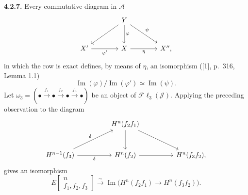 \medskip\noindent\textbf{4.2.7.}
Every commutative diagram in $\mathcal A$
\[
\begin{tikzcd}[column sep=4em,row sep=2.7em]
&Y\arrow[dl]\arrow[d,"\varphi"]\arrow[dr,"\psi"]&\\
X'\arrow[r,"\varphi'"']&X\arrow[r,"\eta"']&X'',
\end{tikzcd}
\]
in which the row is exact defines, by means of $\eta$, an isomorphism
([1], p.~316, Lemma 1.1)
\[
\operatorname{Im}(\varphi)\big/\operatorname{Im}(\varphi')
\simeq\operatorname{Im}(\psi).
\]
Let
$\omega_3=(\mathord\bullet\xrightarrow{f_1}\mathord\bullet
\xrightarrow{f_2}\mathord\bullet\xrightarrow{f_3}\mathord\bullet)$
be an object of $\mathcal{F}\ell_3(\mathcal J)$. Applying the preceding
observation to the diagram
\[
\begin{tikzcd}[column sep=4.6em,row sep=2.8em]
&H^n(f_2f_1)\arrow[d]\arrow[dr]&\\
H^{n-1}(f_3)\arrow[ur,"\delta"]\arrow[r,"\delta"']&
H^n(f_2)\arrow[r]&H^n(f_3f_2),
\end{tikzcd}
\]
gives an isomorphism
\[
E\!\begin{bmatrix}n\\ f_1,f_2,f_3\end{bmatrix}
\xrightarrow{\ \sim\ }
\operatorname{Im}\bigl(H^n(f_2f_1)\longrightarrow H^n(f_3f_2)\bigr).
\tag{4.2.7.1}
\]
\endgroup
